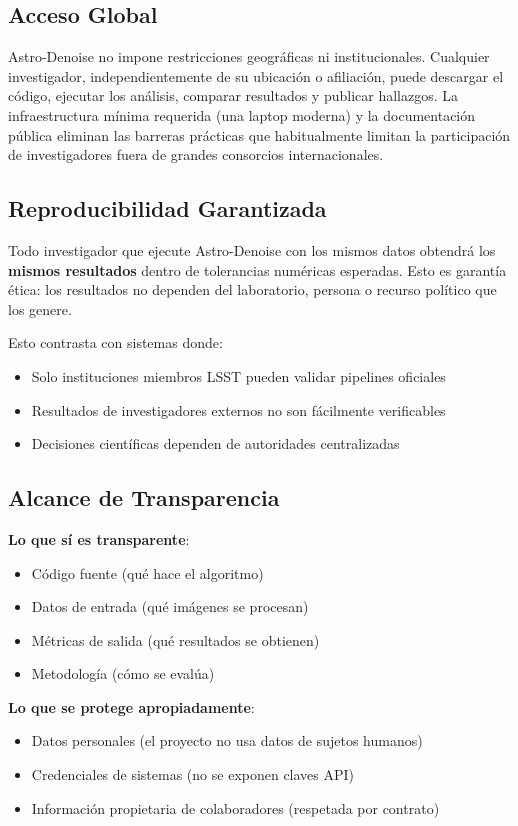 \subsection{Acceso Global}

Astro-Denoise no impone restricciones geográficas ni institucionales. Cualquier investigador, independientemente de su ubicación o afiliación, puede descargar el código, ejecutar los análisis, comparar resultados y publicar hallazgos. La infraestructura mínima requerida (una laptop moderna) y la documentación pública eliminan las barreras prácticas que habitualmente limitan la participación de investigadores fuera de grandes consorcios internacionales.

\subsection{Reproducibilidad Garantizada}

Todo investigador que ejecute Astro-Denoise con los mismos datos obtendrá los \textbf{mismos resultados} dentro de tolerancias numéricas esperadas. Esto es garantía ética: los resultados no dependen del laboratorio, persona o recurso político que los genere.

Esto contrasta con sistemas donde:
\begin{itemize}
    \item Solo instituciones miembros LSST pueden validar pipelines oficiales
    \item Resultados de investigadores externos no son fácilmente verificables
    \item Decisiones científicas dependen de autoridades centralizadas
\end{itemize}

\subsection{Alcance de Transparencia}

\textbf{Lo que sí es transparente}:
\begin{itemize}
    \item Código fuente (qué hace el algoritmo)
    \item Datos de entrada (qué imágenes se procesan)
    \item Métricas de salida (qué resultados se obtienen)
    \item Metodología (cómo se evalúa)
\end{itemize}

\textbf{Lo que se protege apropiadamente}:
\begin{itemize}
    \item Datos personales (el proyecto no usa datos de sujetos humanos)
    \item Credenciales de sistemas (no se exponen claves API)
    \item Información propietaria de colaboradores (respetada por contrato)
\end{itemize}
